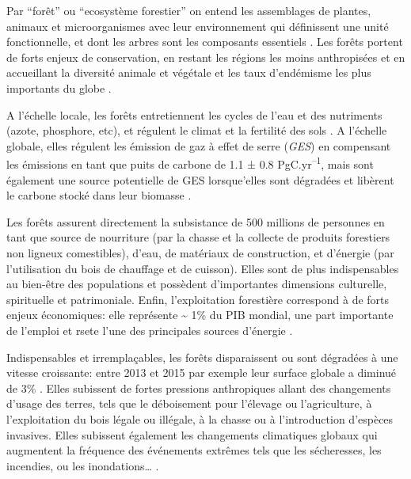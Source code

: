 \documentclass[
  11pt,
  french,
  A4paper,
  extrafontsizes,onecolumn,openright
  ]{memoir}
\begin{document}
Par ``forêt'' ou ``ecosystème forestier'' on entend les assemblages de
plantes, animaux et microorganismes avec leur environnement qui
définissent une unité fonctionnelle, et dont les arbres sont les
composants essentiels \autocite{FRA2000}. Les forêts portent de forts
enjeux de conservation, en restant les régions les moins anthropisées et
en accueillant la diversité animale et végétale et les taux d'endémisme
les plus importants du globe \autocites{Myers2000}{Mittermeier2003}.

A l'échelle locale, les forêts entretiennent les cycles de l'eau et des
nutriments (azote, phosphore, etc), et régulent le climat et la
fertilité des sols \autocites{Malhi2008}{Isbell2017}. A l'échelle
globale, elles régulent les émission de gaz à effet de serre
(\emph{GES}) en compensant les émissions en tant que puits de carbone de
1.1 ± 0.8 PgC.yr\textsuperscript{--1}, mais sont également une source
potentielle de GES lorsque'elles sont dégradées et libèrent le carbone
stocké dans leur biomasse \autocites{Pan2011}{Roy2017}.

Les forêts assurent directement la subsistance de 500 millions de
personnes en tant que source de nourriture (par la chasse et la collecte
de produits forestiers non ligneux comestibles), d'eau, de matériaux de
construction, et d'énergie (par l'utilisation du bois de chauffage et de
cuisson). Elles sont de plus indispensables au bien-être des populations
et possèdent d'importantes dimensions culturelle, spirituelle et
patrimoniale. Enfin, l'exploitation forestière correspond à de forts
enjeux économiques: elle représente \textasciitilde{} 1\% du PIB
mondial, une part importante de l'emploi et rsete l'une des principales
sources d'énergie \autocites{CBDdiversity2011}{FAO2014}.

Indispensables et irremplaçables, les forêts disparaissent ou sont
dégradées à une vitesse croissante: entre 2013 et 2015 par exemple leur
surface globale a diminué de 3\% \autocite{FAO2009}. Elles subissent de
fortes pressions anthropiques allant des changements d'usage des terres,
tels que le déboisement pour l'élevage ou l'agriculture, à
l'exploitation du bois légale ou illégale, à la chasse ou à
l'introduction d'espèces invasives. Elles subissent également les
changements climatiques globaux qui augmentent la fréquence des
événements extrêmes tels que les sécheresses, les incendies, ou les
inondations\ldots{} \autocite{Pachauri2014}.
\end{document}
